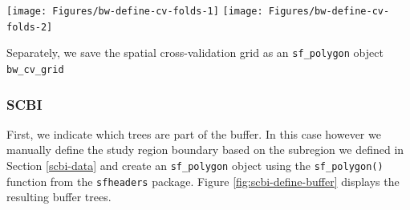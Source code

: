 \documentclass[12pt]{article}
\newenvironment{Shaded}{\begin{snugshade}}{\end{snugshade}}
\newcommand{\DataTypeTok}[1]{\textcolor[rgb]{0.13,0.29,0.53}{#1}}
\newcommand{\DecValTok}[1]{\textcolor[rgb]{0.00,0.00,0.81}{#1}}
\newcommand{\FloatTok}[1]{\textcolor[rgb]{0.00,0.00,0.81}{#1}}
\newcommand{\KeywordTok}[1]{\textcolor[rgb]{0.13,0.29,0.53}{\textbf{#1}}}
\newcommand{\NormalTok}[1]{#1}
\newcommand{\OperatorTok}[1]{\textcolor[rgb]{0.81,0.36,0.00}{\textbf{#1}}}
\newcommand{\StringTok}[1]{\textcolor[rgb]{0.31,0.60,0.02}{#1}}
\begin{document}
\begin{center}\texttt{[image: Figures/bw-define-cv-folds-1]} \texttt{[image: Figures/bw-define-cv-folds-2]} \end{center}

Separately, we save the spatial cross-validation grid as an
\texttt{sf\_polygon} object \texttt{bw\_cv\_grid}

\begin{Shaded}
\end{Shaded}

\hypertarget{scbi-1}{%
\subsubsection{SCBI}\label{scbi-1}}

First, we indicate which trees are part of the buffer. In this case
however we manually define the study region boundary based on the
subregion we defined in Section \ref{scbi-data} and create an
\texttt{sf\_polygon} object using the \texttt{sf\_polygon()} function
from the \texttt{sfheaders} package. Figure \ref{fig:scbi-define-buffer}
displays the resulting buffer trees.

\begin{Shaded}
\end{Shaded}
\end{document}

